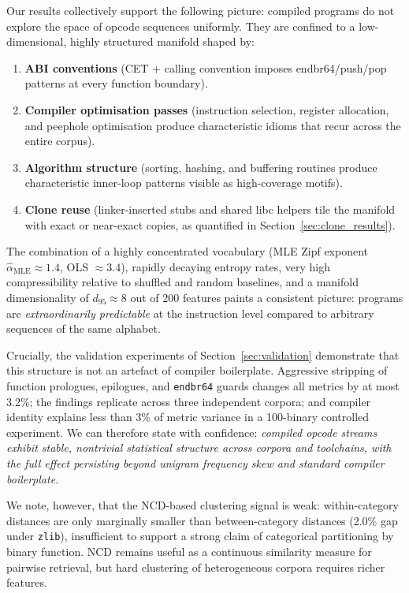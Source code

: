 \documentclass[10pt,twocolumn]{article}
\newcommand{\zlib}{\texttt{zlib}}
\begin{document}
Our results collectively support the following picture: compiled programs do not
explore the space of opcode sequences uniformly.  They are confined to a
low-dimensional, highly structured manifold shaped by:
\begin{enumerate}
  \item \textbf{ABI conventions} (CET + calling convention imposes endbr64/push/pop
        patterns at every function boundary).
  \item \textbf{Compiler optimisation passes} (instruction selection, register
        allocation, and peephole optimisation produce characteristic idioms that
        recur across the entire corpus).
  \item \textbf{Algorithm structure} (sorting, hashing, and buffering routines
        produce characteristic inner-loop patterns visible as high-coverage motifs).
  \item \textbf{Clone reuse} (linker-inserted stubs and shared libc helpers
        tile the manifold with exact or near-exact copies, as quantified in
        Section~\ref{sec:clone_results}).
\end{enumerate}

The combination of a highly concentrated vocabulary (MLE Zipf exponent
$\hat{\alpha}_{\text{MLE}} \approx 1.4$, OLS $\approx 3.4$), rapidly
decaying entropy rates, very high compressibility relative to shuffled and
random baselines, and a manifold dimensionality of $d_{95} \approx 8$ out of
200 features paints a consistent picture: programs are \emph{extraordinarily
predictable} at the instruction level compared to arbitrary sequences of the
same alphabet.

Crucially, the validation experiments of Section~\ref{sec:validation}
demonstrate that this structure is not an artefact of compiler boilerplate.
Aggressive stripping of function prologues, epilogues, and
\texttt{endbr64} guards changes all metrics by at most 3.2\%;
the findings replicate across three independent corpora; and compiler
identity explains less than 3\% of metric variance in a 100-binary
controlled experiment.  We can therefore state with confidence:
\emph{compiled opcode streams exhibit stable, nontrivial statistical
structure across corpora and toolchains, with the full effect persisting
beyond unigram frequency skew and standard compiler boilerplate.}

We note, however, that the NCD-based clustering signal is weak:
within-category distances are only marginally smaller than between-category
distances (2.0\% gap under \zlib{}), insufficient to support a strong
claim of categorical partitioning by binary function.  NCD remains useful
as a continuous similarity measure for pairwise retrieval, but hard
clustering of heterogeneous corpora requires richer features.
\end{document}
